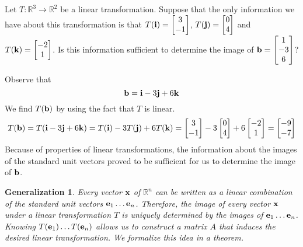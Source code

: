 \documentclass{ximera}
\renewcommand{\vec}[1]{{\bf #1}}
\newcommand{\RR}{\mathbb{R}}
\newtheorem{general}{Generalization}
\begin{document}
\begin{example}  
Let $T:\RR^3\rightarrow \RR^2$ be a linear transformation. Suppose that the only information we have about this transformation is that $T(\vec{i})=\begin{bmatrix}3\\-1\end{bmatrix}$, $T(\vec{j})=\begin{bmatrix}0\\4\end{bmatrix}$ and $T(\vec{k})=\begin{bmatrix}-2\\1\end{bmatrix}$.  Is this information sufficient to determine the image of $\vec{b}=\begin{bmatrix}1\\-3\\6\end{bmatrix}$?

\begin{explanation}  Observe that 
$$\vec{b}=\vec{i}-3\vec{j}+6\vec{k}$$
We find $T(\vec{b})$ by using the fact that $T$ is linear.
$$T(\vec{b})=T(\vec{i}-3\vec{j}+6\vec{k})=T(\vec{i})-3T(\vec{j})+6T(\vec{k})=\begin{bmatrix}3\\-1\end{bmatrix}-3\begin{bmatrix}0\\4\end{bmatrix}+6\begin{bmatrix}-2\\1\end{bmatrix}=\begin{bmatrix}-9\\-7\end{bmatrix}$$
Because of properties of linear transformations, the information about the images of the standard unit vectors proved to be sufficient for us to determine the image of $\vec{b}$. 
\end{explanation}
\end{example}

\begin{general} Every vector $\vec{x}$ of $\RR^n$ can be written as a linear combination of the standard unit vectors $\vec{e}_1\ldots \vec{e}_n$.  Therefore, the image of every vector $\vec{x}$ under a linear transformation $T$ is uniquely determined by the images of $\vec{e}_1\ldots \vec{e}_n$.  Knowing $T(\vec{e}_1)\ldots T(\vec{e}_n)$ allows us to construct a matrix $A$ that induces the desired linear transformation.  We formalize this idea in a theorem.
\end{general}
\end{document}
